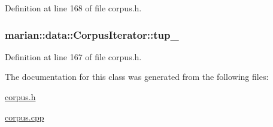 Definition at line 168 of file corpus.\+h.

\subsubsection[{\texorpdfstring{tup\+\_\+}{tup_}}]{ marian\+::data\+::\+Corpus\+Iterator\+::tup\+\_\+\hspace{0.3cm}{\ttfamily [private]}}\hypertarget{classmarian_1_1data_1_1CorpusIterator_ab7067a22ad8be0e6598b80ee39a19c4e}{}\label{classmarian_1_1data_1_1CorpusIterator_ab7067a22ad8be0e6598b80ee39a19c4e}


Definition at line 167 of file corpus.\+h.



The documentation for this class was generated from the following files\+:\begin{DoxyCompactItemize}
\item 
\hyperlink{corpus_8h}{corpus.\+h}\item 
\hyperlink{corpus_8cpp}{corpus.\+cpp}\end{DoxyCompactItemize}
